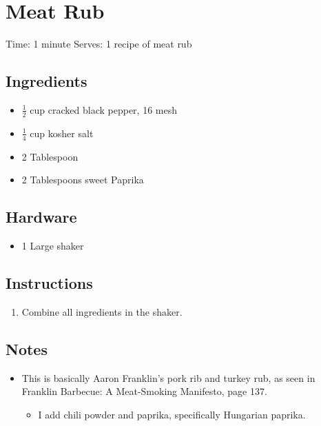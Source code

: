 \section{Meat Rub}
\label{meatRub}
\setcounter{secnumdepth}{0}
Time: 1 minute
Serves: 1 recipe of meat rub

\begin{multicols}{2}
\subsection*{Ingredients}
\begin{itemize}
    \item \( \frac{1}{2} \) cup cracked black pepper, 16 mesh
    \item \( \frac{1}{4} \) cup kosher salt
    \item 2 Tablespoon 
    \item 2 Tablespoons sweet Paprika
\end{itemize}

\subsection*{Hardware}
\begin{itemize}
    \item 1 Large shaker
\end{itemize}
\clearpage

\subsection*{Instructions}
\begin{enumerate}
    \item Combine all ingredients in the shaker.
\end{enumerate}

\subsection*{Notes}
\begin{itemize}
    \item This is basically Aaron Franklin's pork rib and turkey rub, as seen in Franklin Barbecue: A Meat-Smoking Manifesto, page 137.
    \begin{itemize}
    	\item I add chili powder and paprika, specifically Hungarian paprika.
    \end{itemize}
\end{itemize}
\end{multicols}
\clearpage